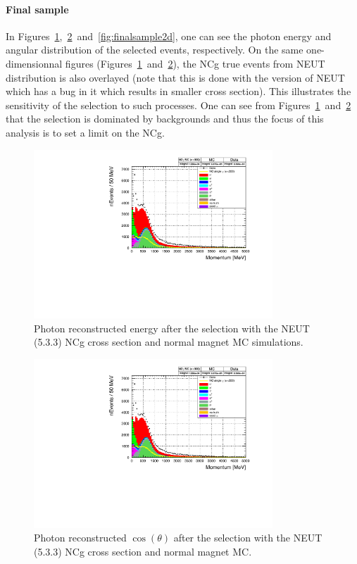 \paragraph{Final sample}
In
Figures~\ref{fig:finalsample},~\ref{fig:finalsamplecos}~and~\ref{fig:finalsample2d},
one can see the photon energy and angular distribution of the selected
events, respectively. On the same one-dimensionnal figures
(Figures~\ref{fig:finalsample}~and~\ref{fig:finalsamplecos}), the
\Gls{NCg} true events from \Gls{NEUT} distribution is also overlayed
(note that this is done with the version of \Gls{NEUT} which has a bug
in it which results in smaller cross section). This illustrates the
sensitivity of the selection to such processes. One can see from
Figures~\ref{fig:finalsample}~and~\ref{fig:finalsamplecos} that the
selection is dominated by backgrounds and thus the focus of this
analysis is to set a limit on the \Gls{NCg}.

\begin{figure}[ht]
  \center
  \includegraphics[width=0.8\textwidth,page=12]{images/NCg/Selection.pdf}
  \caption[Photon reconstructed energy after the selection]{Photon
    reconstructed energy after the selection with the \Gls{NEUT}
    (5.3.3) \Gls{NCg} cross section and normal magnet \Gls{MC}
    simulations.}
  \label{fig:finalsample}
\end{figure}

\begin{figure}[ht]
  \center
  \includegraphics[width=0.8\textwidth,page=13]{images/NCg/Selection.pdf}
  \caption[Photon reconstructed $\cos(\theta)$ after the
  selection]{Photon reconstructed $\cos(\theta)$ after the selection
    with the \Gls{NEUT} (5.3.3) \Gls{NCg} cross section and normal
    magnet \Gls{MC}.}
  \label{fig:finalsamplecos}
\end{figure}

